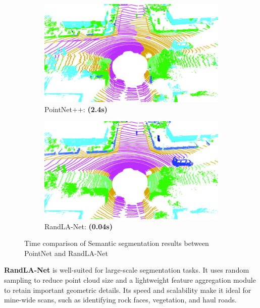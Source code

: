 \documentclass{article}
\begin{document}
\begin{figure}[h!]
	\centering
	\begin{subfigure}[b]{0.48\linewidth}
		\centering
		\includegraphics[width=\linewidth]{figures/randla/pointnet.png}
		\caption{PointNet++: \textbf{(2.4s)}}
		\label{fig:PointNet}
	\end{subfigure}
	\hfill
	\begin{subfigure}[b]{0.48\linewidth}
		\centering
		\includegraphics[width=\linewidth]{figures/randla/randla.png}
		\caption{RandLA-Net: \textbf{(0.04s)}}
		\label{fig:modelB}
	\end{subfigure}
	\caption{Time comparison of Semantic segmentation results between PointNet and RandLA-Net \cite{randlanet}}
	\label{fig:cnnComparison}
\end{figure}

\textbf{RandLA-Net} is well-suited for large-scale segmentation tasks. It uses random sampling to reduce point cloud size and a lightweight feature aggregation module to retain important geometric details. Its speed and scalability make it ideal for mine-wide scans, such as identifying rock faces, vegetation, and haul roads. \cite{randlanet}
\end{document}

